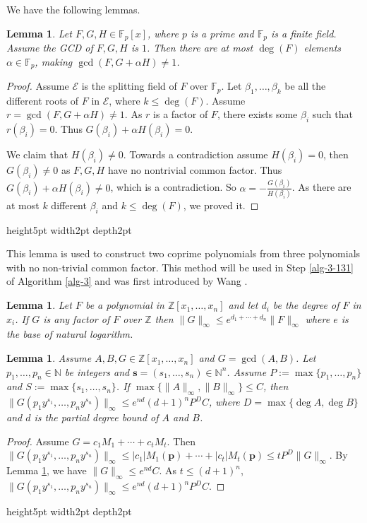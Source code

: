 \documentclass[final,20pt]{elsarticle}
\newtheorem{lemma}[theorem]{Lemma}
\def\N{{\mathbb N}}
\def\Z{{\mathbb Z}}
\def\F{{\mathbb{F}}}
\def\qed{\hfil {\vrule height5pt width2pt depth2pt}}
\begin{document}
%

We have the following lemmas.
\begin{lemma}\label{lm-10}
Let $F,G,H\in\F_p[x]$, where $p$ is a prime and $\F_p$ is a finite field. Assume the GCD of $F,G,H$ is $1$. Then there are at most $\deg(F)$ elements $\alpha\in \F_p$, making $\gcd(F,G+\alpha H)\neq 1$.
\end{lemma}
\begin{proof}
Assume $\mathcal{E}$ is the splitting field of $F$ over $\F_p$. Let $\beta_1,\dots,\beta_k$ be all the different roots of $F$ in $\mathcal{E}$, where $k\leq \deg(F)$. Assume $r=\gcd(F,G+\alpha H)\neq 1$.
%
As $r$ is a factor of $F$, there exists some $\beta_i$ such that $r(\beta_i)=0$.
%
Thus $G(\beta_i)+\alpha H(\beta_i)=0$.

We claim that $H(\beta_i)\neq 0$.
%
Towards a contradiction assume $H(\beta_i)=0$, then $G(\beta_i)\neq 0$ as $F,G,H$ have no nontrivial common factor. Thus $G(\beta_i)+\alpha H(\beta_i)\neq 0$, which is a contradiction.
%
So $\alpha=-\frac{G(\beta_i)}{H(\beta_i)}$. As there are at most $k$ different $\beta_i$ and $k\leq \deg (F)$, we proved it.
\end{proof}\qed

\vspace{5pt}
This lemma is used to construct two coprime polynomials from three polynomials with no non-trivial common factor.  This method will be used in Step \ref{alg-3-131} of Algorithm \ref{alg-3} and was first introduced by Wang \cite{Wang80b}.

\begin{lemma}\label{lm-1}\cite{gelfond2015} Let $F$ be a polynomial in $\Z[x_1,\dots,x_n]$ and let $d_i$ be the degree of $F$ in $x_i$. If $G$ is any factor of $F$
over $\Z$ then $\|G\|_\infty\leq e^{d_1+\cdots+d_n}\|F\|_\infty$ where $e$ is the base of natural logarithm.
\end{lemma}

\begin{lemma}\label{lm-11}
Assume $A,B,G\in \Z[x_1,\dots,x_n]$ and $G=\gcd(A,B)$. Let $p_1,\dots,p_n\in\N$ be integers and $\mathbf{s}=(s_1,\dots,s_n)\in\N^n$. Assume $P:=\max\{p_1,\dots,p_n\}$ and $S:=\max\{s_1,\dots,s_n\}$. If $\max\{\|A\|_{\infty},\|B\|_{\infty}\}\leq C$, then $\|G(p_1y^{s_1},\dots,p_ny^{s_n})\|_{\infty}\leq e^{nd}(d+1)^nP^{D}C$,
where $D=\max\{\deg A,\deg B\}$ and $d$ is the partial degree bound of $A$ and $B$.
\end{lemma}
\begin{proof}
Assume $G=c_1M_1+\cdots+c_tM_t.$
Then $\|G(p_1y^{s_1},\dots,p_ny^{s_n})\|_{\infty}\leq |c_1|M_1(\mathbf{p})+\cdots+|c_t|M_t(\mathbf{p})\leq tP^{D}\|G\|_{\infty}$.  By Lemma \ref{lm-1}, we have $\|G\|_\infty\leq e^{nd}C$. As $t\leq (d+1)^n$, $\|G(p_1y^{s_1},\dots,p_ny^{s_n})\|_{\infty}\leq e^{nd}(d+1)^nP^{D}C$.
\end{proof}\qed
\end{document}
